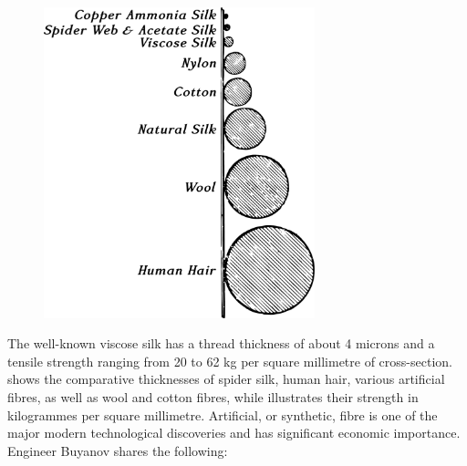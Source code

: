 \begin{figure}[h!]
\centering
\includegraphics[width=0.7\textwidth]{figures/ch-11/fig-163a.pdf}
\end{figure}



The well-known viscose silk has a thread thickness of about 4 microns and a tensile strength ranging from 20 to 62 kg per square millimetre of cross-section.  shows the comparative thicknesses of spider silk, human hair, various artificial fibres, as well as wool and cotton fibres, while  illustrates their strength in kilogrammes per square millimetre. Artificial, or synthetic, fibre is one of the major modern technological discoveries and has significant economic importance. Engineer Buyanov shares the following:
 
